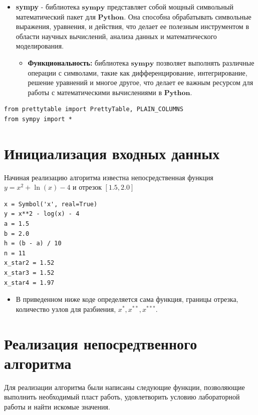 \documentclass{article}
\begin{document}
\begin{itemize}
    \item \textbf{sympy} - библиотека $\textbf{sympy}$ представляет собой мощный символьный математический пакет для $\textbf{Python}$. Она способна обрабатывать символьные выражения, уравнения, и действия, что делает ее полезным инструментом в области научных вычислений, анализа данных и математического моделирования.
    \begin{itemize}
        \item \textbf{Функциональность:} библиотека $\textbf{sympy}$ позволяет выполнять различные операции с символами, такие как дифференцирование, интегрирование, решение уравнений и многое другое, что делает ее важным ресурсом для работы с математическими вычислениями в $\textbf{Python}$.
    \end{itemize}
\end{itemize}

\begin{lstlisting}
from prettytable import PrettyTable, PLAIN_COLUMNS
from sympy import *
\end{lstlisting}

\section{Инициализация входных данных}
Начиная реализацию алгоритма известна непосредственная функция$y=x^2 + \ln(x) - 4$ и отрезок $[1.5,2.0]$ \

\begin{lstlisting}
x = Symbol('x', real=True)
y = x**2 - log(x) - 4
a = 1.5
b = 2.0
h = (b - a) / 10
n = 11
x_star2 = 1.52
x_star3 = 1.52
x_star4 = 1.97
\end{lstlisting}

\begin{itemize}
\item В приведенном ниже коде определяется сама функция, границы отрезка, количество узлов для разбиения, $x^{*}, x^{**}, x^{***}$.
\end{itemize}

\section{Реализация непосредтвенного алгоритма}
Для реализации алгоритма были написаны следующие функции, позволяющие выполнить необходимый пласт работь, удовлетворить условию лабораторной работы и найти искомые значения. \\
\end{document}
